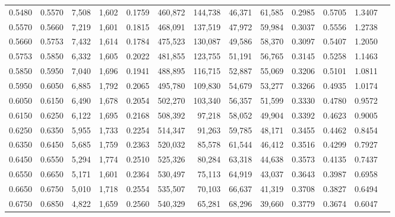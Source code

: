 \begin{tabular}{rrrrrrrrrrrrr}
0.5480 & 0.5570 &  7,508 & 1,602 &                                     0.1759 & 460,872 & 144,738 &  46,371 &  61,585 & 0.2985 & 0.5705 & 1.3407 \\
0.5570 & 0.5660 &  7,219 & 1,601 &                                     0.1815 & 468,091 & 137,519 &  47,972 &  59,984 & 0.3037 & 0.5556 & 1.2738 \\
0.5660 & 0.5753 &  7,432 & 1,614 &                                     0.1784 & 475,523 & 130,087 &  49,586 &  58,370 & 0.3097 & 0.5407 & 1.2050 \\
0.5753 & 0.5850 &  6,332 & 1,605 &                                     0.2022 & 481,855 & 123,755 &  51,191 &  56,765 & 0.3145 & 0.5258 & 1.1463 \\
0.5850 & 0.5950 &  7,040 & 1,696 &                                     0.1941 & 488,895 & 116,715 &  52,887 &  55,069 & 0.3206 & 0.5101 & 1.0811 \\
0.5950 & 0.6050 &  6,885 & 1,792 &                                     0.2065 & 495,780 & 109,830 &  54,679 &  53,277 & 0.3266 & 0.4935 & 1.0174 \\
0.6050 & 0.6150 &  6,490 & 1,678 &                                     0.2054 & 502,270 & 103,340 &  56,357 &  51,599 & 0.3330 & 0.4780 & 0.9572 \\
0.6150 & 0.6250 &  6,122 & 1,695 &                                     0.2168 & 508,392 &  97,218 &  58,052 &  49,904 & 0.3392 & 0.4623 & 0.9005 \\
0.6250 & 0.6350 &  5,955 & 1,733 &                                     0.2254 & 514,347 &  91,263 &  59,785 &  48,171 & 0.3455 & 0.4462 & 0.8454 \\
0.6350 & 0.6450 &  5,685 & 1,759 &                                     0.2363 & 520,032 &  85,578 &  61,544 &  46,412 & 0.3516 & 0.4299 & 0.7927 \\
0.6450 & 0.6550 &  5,294 & 1,774 &                                     0.2510 & 525,326 &  80,284 &  63,318 &  44,638 & 0.3573 & 0.4135 & 0.7437 \\
0.6550 & 0.6650 &  5,171 & 1,601 &                                     0.2364 & 530,497 &  75,113 &  64,919 &  43,037 & 0.3643 & 0.3987 & 0.6958 \\
0.6650 & 0.6750 &  5,010 & 1,718 &                                     0.2554 & 535,507 &  70,103 &  66,637 &  41,319 & 0.3708 & 0.3827 & 0.6494 \\
0.6750 & 0.6850 &  4,822 & 1,659 &                                     0.2560 & 540,329 &  65,281 &  68,296 &  39,660 & 0.3779 & 0.3674 & 0.6047 \\

\end{tabular}
